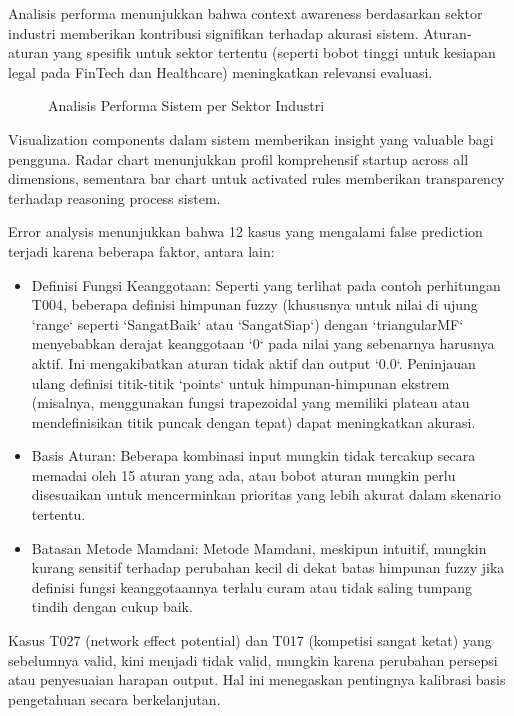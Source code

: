 \documentclass[12pt,a4paper]{article}
\begin{document}
Analisis performa menunjukkan bahwa context awareness berdasarkan sektor industri memberikan kontribusi signifikan terhadap akurasi sistem. Aturan-aturan yang spesifik untuk sektor tertentu (seperti bobot tinggi untuk kesiapan legal pada FinTech dan Healthcare) meningkatkan relevansi evaluasi.

\begin{figure}[htbp] %
    \centering
    \caption{Analisis Performa Sistem per Sektor Industri}
    \label{fig:sector-analysis}
\end{figure}

Visualization components dalam sistem memberikan insight yang valuable bagi pengguna. Radar chart menunjukkan profil komprehensif startup across all dimensions, sementara bar chart untuk activated rules memberikan transparency terhadap reasoning process sistem.

Error analysis menunjukkan bahwa 12 kasus yang mengalami false prediction terjadi karena beberapa faktor, antara lain:
\begin{itemize}
    \item Definisi Fungsi Keanggotaan: Seperti yang terlihat pada contoh perhitungan T004, beberapa definisi himpunan fuzzy (khususnya untuk nilai di ujung `range` seperti `SangatBaik` atau `SangatSiap`) dengan `triangularMF` menyebabkan derajat keanggotaan `0` pada nilai yang sebenarnya harusnya aktif. Ini mengakibatkan aturan tidak aktif dan output `0.0`. Peninjauan ulang definisi titik-titik `points` untuk himpunan-himpunan ekstrem (misalnya, menggunakan fungsi trapezoidal yang memiliki plateau atau mendefinisikan titik puncak dengan tepat) dapat meningkatkan akurasi.
    \item Basis Aturan: Beberapa kombinasi input mungkin tidak tercakup secara memadai oleh 15 aturan yang ada, atau bobot aturan mungkin perlu disesuaikan untuk mencerminkan prioritas yang lebih akurat dalam skenario tertentu.
    \item Batasan Metode Mamdani: Metode Mamdani, meskipun intuitif, mungkin kurang sensitif terhadap perubahan kecil di dekat batas himpunan fuzzy jika definisi fungsi keanggotaannya terlalu curam atau tidak saling tumpang tindih dengan cukup baik.
\end{itemize}
Kasus T027 (network effect potential) dan T017 (kompetisi sangat ketat) yang sebelumnya valid, kini menjadi tidak valid, mungkin karena perubahan persepsi atau penyesuaian harapan output. Hal ini menegaskan pentingnya kalibrasi basis pengetahuan secara berkelanjutan.
\end{document}
